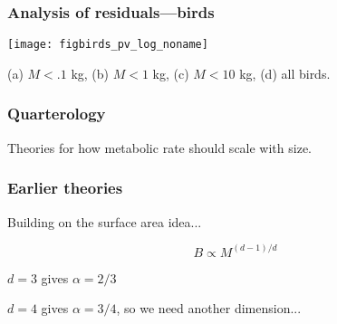 \begin{frame}
  \frametitle{Analysis of residuals---birds}

  \vspace{5mm}
  \begin{center}
    \texttt{[image: figbirds\_pv\_log\_noname]}
  \end{center}
{\small (a) $M<.1$ kg, (b) $M<1$ kg, (c) $M<10$ kg, (d) all birds.}





\end{frame}

\begin{frame}
  \frametitle{Quarterology}

Theories for how metabolic rate should scale with size.

\end{frame}

\begin{frame}
  \frametitle{Earlier theories}

Building on the surface area idea...


$$B \propto M^{(d-1)/d}$$

\inv

$d=3$ gives $\alpha = 2/3$

$d=4$ gives $\alpha = 3/4$, so we need another dimension...

\vis

\end{frame}

